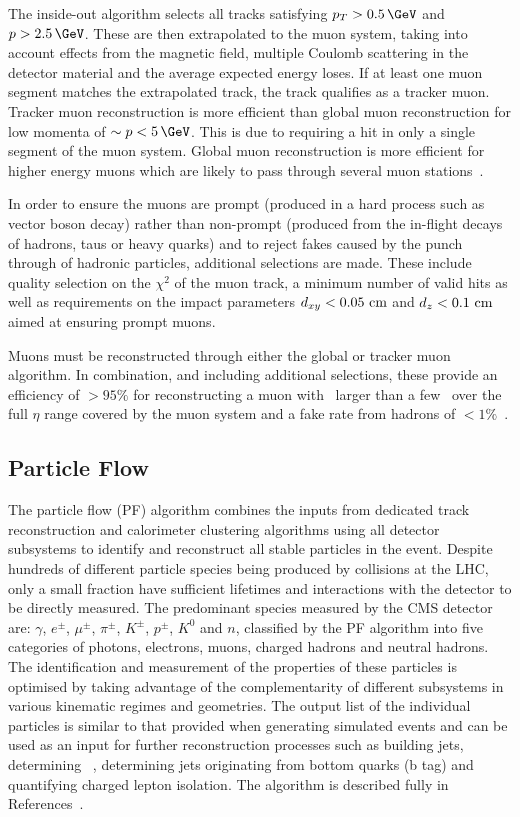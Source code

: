 The inside-out algorithm selects all tracks satisfying $p_T > 0.5\,\GeV$ and $p > 2.5\,\GeV$. These are then 
extrapolated to the muon system, taking into account effects from the magnetic field, multiple Coulomb scattering
in the detector material and the average expected energy loses. If at least one muon segment matches 
the extrapolated track, the track qualifies as a tracker muon. Tracker muon reconstruction is more efficient
than global muon reconstruction for low momenta of $\sim p< 5\,\GeV$. This is due
to requiring a hit in only a single segment of the muon system. Global muon reconstruction is 
more efficient for higher energy muons which are likely to pass through several muon stations~\cite{muon_reco}.

In order to ensure the muons are prompt (produced in a hard process such as vector boson decay) rather
than non-prompt (produced from the in-flight decays of hadrons, taus or heavy quarks) and to reject fakes
caused by the punch through of hadronic particles, additional selections are made. These include quality
selection on the $\chi^2$ of the muon track, a minimum number of valid hits as well as requirements
on the impact parameters $d_{xy} < 0.05\,\,\text{cm}$ and $d_{z} < 0.1\,\,\text{cm}$ aimed at ensuring prompt muons.

Muons must be reconstructed through either the global or tracker muon algorithm. In combination, and
including additional selections, these provide an efficiency of $>95\%$ for reconstructing a muon 
with \pt~larger than a few \GeV~over the full $\eta$ range covered by the
muon system and a fake rate from hadrons of $<1\%$~\cite{muon_reco}.

\subsection{Particle Flow}
\label{sec:particle_flow}
The particle flow (PF) algorithm combines the inputs from dedicated track reconstruction and calorimeter clustering
algorithms using all detector subsystems to identify and reconstruct all stable particles in the event.
Despite hundreds of different particle species being produced by collisions at the LHC, only a small fraction
have sufficient lifetimes and interactions with the detector to be directly measured. The predominant species
measured by the CMS detector are: $\gamma$, $e^{\pm}$, $\mu^{\pm}$, $\pi^{\pm}$, $K^{\pm}$, $p^{\pm}$, $K^{0}$
and $n$, classified by the PF algorithm into five categories of photons, electrons, muons, charged hadrons and neutral hadrons. 
The identification and measurement of the properties of these particles is optimised by taking advantage of the complementarity of 
different subsystems in various kinematic regimes and geometries. The output list of the individual particles is similar to that provided
when generating simulated events and can be used as an input for further reconstruction processes
such as building jets, determining \met~, determining jets originating from bottom quarks (b tag) and quantifying
charged lepton isolation. The algorithm is described fully in References~\cite{pf_proc,pf_pas}.

